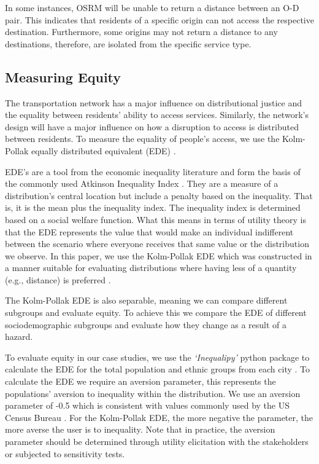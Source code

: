 \documentclass[review,3p,times,onecolumn,sort&compress,12pt]{elsarticle}
\let \cite \parencite
\begin{document}
In some instances, OSRM will be unable to return a distance between an O-D pair.
This indicates that residents of a specific origin can not access the respective destination.
Furthermore, some origins may not return a distance to any destinations, therefore, are isolated from the specific service type.

\subsection{Measuring Equity}
The transportation network has a major influence on distributional justice and the equality between residents' ability to access services.
Similarly, the network's design will have a major influence on how a disruption to access is distributed between residents.
To measure the equality of people's access, we use the Kolm-Pollak equally distributed equivalent (EDE) \cite{sheriff2020health, Logan2021-ineq}. 

EDE's are a tool from the economic inequality literature and form the basis of the commonly used Atkinson Inequality Index \cite{Atkinson1970-mr}. 
They are a measure of a distribution's central location but include a penalty based on the inequality.
That is, it is the mean plus the inequality index.
The inequality index is determined based on a social welfare function. 
What this means in terms of utility theory is that the EDE represents the value that would make an individual indifferent between the scenario where everyone receives that same value or the distribution we observe.
In this paper, we use the Kolm-Pollak EDE which was constructed in a manner suitable for evaluating distributions where having less of a quantity (e.g., distance) is preferred \cite{sheriff2020health,Logan2021-ineq}.

The Kolm-Pollak EDE is also separable, meaning we can compare different subgroups and evaluate equity.
To achieve this we compare the EDE of different sociodemographic subgroups and evaluate how they change as a result of a hazard.

To evaluate equity in our case studies, we use the \textit{`Inequalipy'} python package to calculate the EDE for the total population and ethnic groups from each city \cite{Logan2021-ineq}.
To calculate the EDE we require an aversion parameter, this represents the populations' aversion to inequality within the distribution.
We use an aversion parameter of -0.5 which is consistent with values commonly used by the US Census Bureau \cite{Jones2000-xv}.
For the Kolm-Pollak EDE, the more negative the parameter, the more averse the user is to inequality.
Note that in practice, the aversion parameter should be determined through utility elicitation with the stakeholders or subjected to sensitivity tests.
\end{document}
